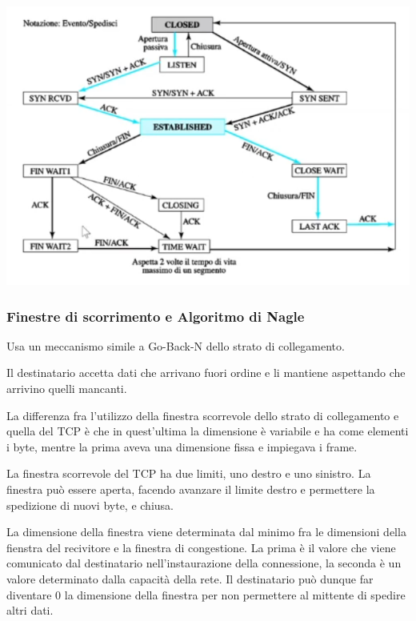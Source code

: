     \begin{center}
        \includegraphics[scale=0.5]{images/Diagramma-di-Stato.png}
    \end{center}
    
    \subsubsection{Finestre di scorrimento e Algoritmo di Nagle}
    
        Usa un meccanismo simile a Go-Back-N dello strato di collegamento.
        
        Il destinatario accetta dati che arrivano fuori ordine e li mantiene aspettando che arrivino quelli mancanti.
        
        La differenza fra l'utilizzo della finestra scorrevole dello strato di collegamento e quella del TCP è che in quest'ultima la dimensione è variabile e ha come elementi i byte, mentre la prima aveva una dimensione fissa e impiegava i frame.
        
        La finestra scorrevole del TCP ha due limiti, uno destro e uno sinistro. La finestra può essere aperta, facendo avanzare il limite destro e permettere la spedizione di nuovi byte, e chiusa.
        
        La dimensione della finestra viene determinata dal minimo fra le dimensioni della fienstra del recivitore e la finestra di congestione. La prima è il valore che viene comunicato dal destinatario nell'instaurazione della connessione, la seconda è un valore determinato dalla capacità della rete. Il destinatario può dunque far diventare 0 la dimensione della finestra per non permettere al mittente di spedire altri dati.
        

